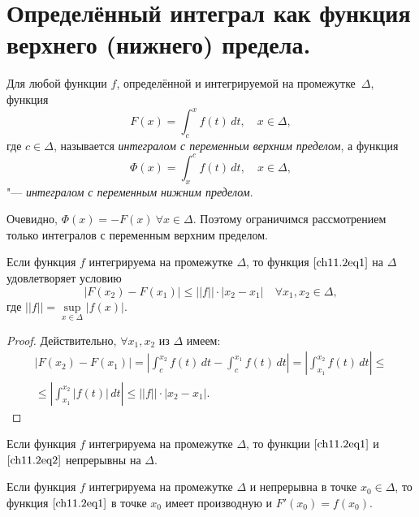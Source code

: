 \section{Определённый интеграл как функция верхнего (нижнего) предела.}

Для любой функции $f$, определённой и интегрируемой на промежутке~$\Delta$, функция
\begin{equation} \label{ch11.2eq1}
F(x) = \int_{c}^{x} f(t) \,dt, \quad x \in \Delta,
\end{equation}
где $c \in \Delta$, называется \textit{интегралом с переменным верхним пределом}, а функция
\begin{equation} \label{ch11.2eq2}
\Phi(x) = \int_{x}^{c} f(t) \,dt, \quad x \in \Delta,
\end{equation}
"--- \textit{интегралом с переменным нижним пределом}.

Очевидно, $\Phi(x) = -F(x)\ \forall x \in \Delta$. Поэтому ограничимся рассмотрением только интегралов с переменным верхним пределом.

\begin{thm}
Если функция $f$ интегрируема на промежутке $\Delta$, то функция $\eqref{ch11.2eq1}$ на $\Delta$ удовлетворяет условию
$$
|F(x_2) - F(x_1)| \le ||f|| \cdot |x_2 - x_1| \quad \forall x_1, x_2 \in \Delta,
$$
где $||f|| = \sup\limits_{x \in \Delta} |f(x)|$.
\end{thm}

\begin{proof}
Действительно, $\forall x_1, x_2$ из $\Delta$ имеем:
\begin{multline*}
|F(x_2) - F(x_1)| = \left| \int_{c}^{x_2}f(t) \,dt - \int_{c}^{x_1} f(t) \,dt\right| = \left| \int_{x_1}^{x_2}f(t) \,dt \right| \le\\ \le \left| \int_{x_1}^{x_2}|f(t)| \,dt \right| \le ||f|| \cdot |x_2 - x_1|.\tag*{\qedhere}
\end{multline*}
\end{proof}

\begin{cons}
Если функция $f$ интегрируема на промежутке $\Delta$, то функции $\eqref{ch11.2eq1}$ и $\eqref{ch11.2eq2}$ непрерывны на $\Delta$.
\end{cons}

\begin{thm}
Если функция $f$ интегрируема на промежутке $\Delta$ и непрерывна в точке $x_0 \in \Delta$, то функция $\eqref{ch11.2eq1}$ в точке $x_0$ имеет производную и $F'(x_0) = f(x_0)$.
\end{thm}

